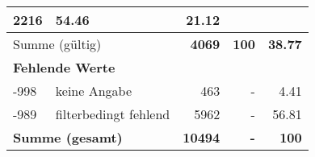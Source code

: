 \begin{longtable}{lXrrr}
       \num{2216} &
       \num[round-mode=places,round-precision=2]{54.46} &
         \num[round-mode=places,round-precision=2]{21.12} \\
     \midrule
     \multicolumn{2}{l}{Summe (gültig)} &
       \textbf{\num{4069}} &
     \textbf{\num{100}} &
       \textbf{\num[round-mode=places,round-precision=2]{38.77}} \\
     \multicolumn{5}{l}{\textbf{Fehlende Werte}}\\
       -998 &
       keine Angabe &
         \num{463} &
        - &
         \num[round-mode=places,round-precision=2]{4.41} \\
       -989 &
       filterbedingt fehlend &
         \num{5962} &
        - &
         \num[round-mode=places,round-precision=2]{56.81} \\
     \midrule
     \multicolumn{2}{l}{\textbf{Summe (gesamt)}} &
          \textbf{\num{10494}} &
        \textbf{-} &
        \textbf{\num{100}} \\
     \bottomrule
     \end{longtable}
     
